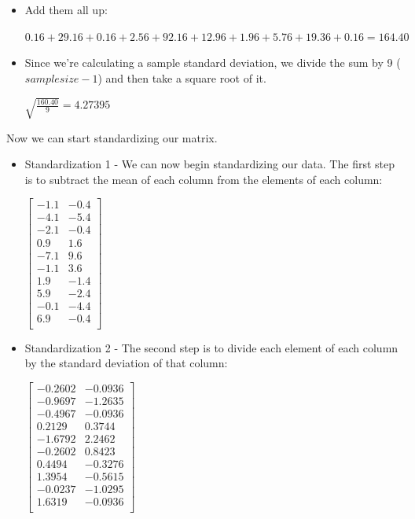 \documentclass[12pt]{article}
\begin{document}
\begin{itemize}
\begin{itemize}
\item
Add them all up:\\
\begin{center}
$0.16+29.16+0.16+2.56+92.16+12.96+1.96+5.76+19.36+0.16 = 164.40$
\end{center}

\item
Since we're calculating a sample standard deviation, we divide the sum by 9 ($sample size - 1$) and then take a square root of it.\\
\begin{center}
$\sqrt{\frac{160.40}{9}} = 4.27395$
\end{center}

\end{itemize}
\end{itemize}
\noindent
Now we can start standardizing our matrix.
\begin{itemize}
\item
Standardization 1 - We can now begin standardizing our data. The first step is to subtract the mean of each column from the elements of each column:\\
\begin{center}
$\begin{bmatrix}
-1.1 & -0.4\\
-4.1 & -5.4\\
-2.1 & -0.4\\
0.9 & 1.6\\
-7.1 & 9.6\\
-1.1 & 3.6\\
1.9 & -1.4\\
5.9 & -2.4\\
-0.1 & -4.4\\
6.9 & -0.4\\
\end{bmatrix}$
\end{center}

\item
Standardization 2 - The second step is to divide each element of each column by the standard deviation of that column:\\
\begin{center}
$\begin{bmatrix}
-0.2602 & -0.0936\\
-0.9697 & -1.2635\\
-0.4967 & -0.0936\\
0.2129 & 0.3744\\
-1.6792 & 2.2462\\
-0.2602 & 0.8423\\
0.4494 & -0.3276\\
1.3954 & -0.5615\\
-0.0237 & -1.0295\\
1.6319 & -0.0936\\
\end{bmatrix}$
\end{center}
\end{itemize}
\end{document}

